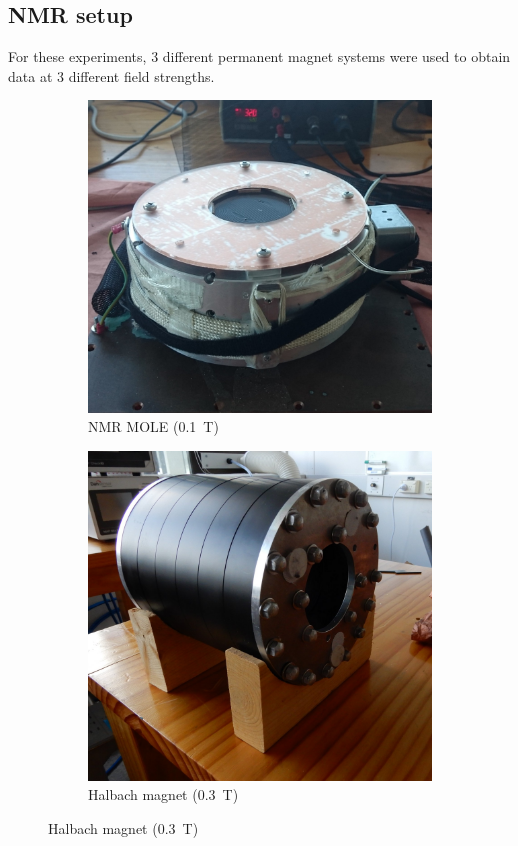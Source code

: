 \subsection{NMR setup}
For these experiments, 3 different permanent magnet systems were used to obtain data at 3 different field strengths.
\begin{figure}[t]
\centering
\begin{subfigure}[t]{0.4\textwidth}
\includegraphics[width=\textwidth]{figures/exptsetup/nmrmole.jpg}
\caption{NMR MOLE (\SI{0.1}{T})}
\label{fit:exptsetup-nmrmole}
\end{subfigure}
\hspace{0.5cm}
\begin{subfigure}[t]{0.4\textwidth}
\includegraphics[width=\textwidth]{figures/exptsetup/halbach.jpg}
\caption{Halbach magnet (\SI{0.3}{T})}
\label{fig:exptsetup-halbach}
\end{subfigure}


\end{figure}
